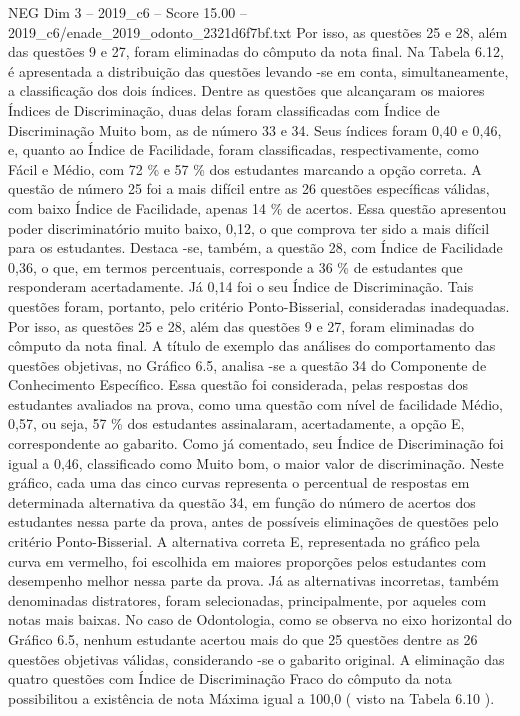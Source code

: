 \begin{textsample}{NEG Dim 3 – 2019\_c6 – Score 15.00 – 2019\_c6/enade\_2019\_odonto\_2321d6f7bf.txt}
Por isso, as questões 25 e 28, além das questões 9 e 27, foram eliminadas do cômputo da nota final.
Na Tabela 6.12, é apresentada a distribuição das questões levando -se em conta, simultaneamente, a classificação dos dois índices.
Dentre as questões que alcançaram os maiores Índices de Discriminação, duas delas foram classificadas com Índice de Discriminação Muito bom, as de número 33 e 34.
Seus índices foram 0,40 e 0,46, e, quanto ao Índice de Facilidade, foram classificadas, respectivamente, como Fácil e Médio, com 72 \% e 57 \% dos estudantes marcando a opção correta.
A questão de número 25 foi a mais difícil entre as 26 questões específicas válidas, com baixo Índice de Facilidade, apenas 14 \% de acertos.
Essa questão apresentou poder discriminatório muito baixo, 0,12, o que comprova ter sido a mais difícil para os estudantes.
Destaca -se, também, a questão 28, com Índice de Facilidade 0,36, o que, em termos percentuais, corresponde a 36 \% de estudantes que responderam acertadamente.
Já 0,14 foi o seu Índice de Discriminação.
Tais questões foram, portanto, pelo critério Ponto-Bisserial, consideradas inadequadas.
Por isso, as questões 25 e 28, além das questões 9 e 27, foram eliminadas do cômputo da nota final.
A título de exemplo das análises do comportamento das questões objetivas, no Gráfico 6.5, analisa -se a questão 34 do Componente de Conhecimento Específico.
Essa questão foi considerada, pelas respostas dos estudantes avaliados na prova, como uma questão com nível de facilidade Médio, 0,57, ou seja, 57 \% dos estudantes assinalaram, acertadamente, a opção E, correspondente ao gabarito.
Como já comentado, seu Índice de Discriminação foi igual a 0,46, classificado como Muito bom, o maior valor de discriminação.
Neste gráfico, cada uma das cinco curvas representa o percentual de respostas em determinada alternativa da questão 34, em função do número de acertos dos estudantes nessa parte da prova, antes de possíveis eliminações de questões pelo critério Ponto-Bisserial.
A alternativa correta E, representada no gráfico pela curva em vermelho, foi escolhida em maiores proporções pelos estudantes com desempenho melhor nessa parte da prova.
Já as alternativas incorretas, também denominadas distratores, foram selecionadas, principalmente, por aqueles com notas mais baixas.
No caso de Odontologia, como se observa no eixo horizontal do Gráfico 6.5, nenhum estudante acertou mais do que 25 questões dentre as 26 questões objetivas válidas, considerando -se o gabarito original.
A eliminação das quatro questões com Índice de Discriminação Fraco do cômputo da nota possibilitou a existência de nota Máxima igual a 100,0 ( visto na Tabela 6.10 ).

\end{textsample}
